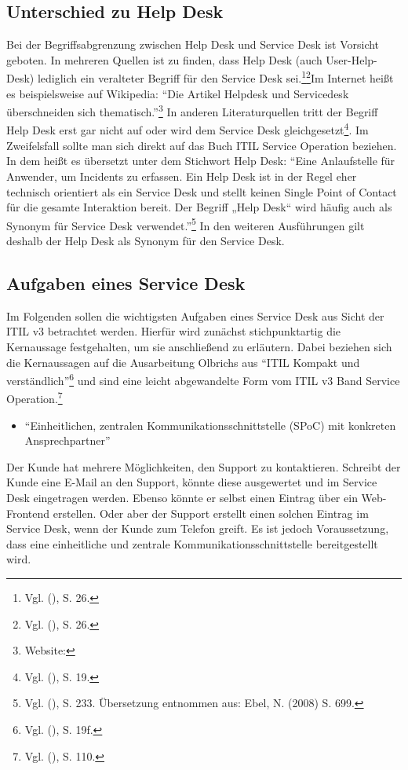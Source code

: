 \subsection{Unterschied zu Help Desk}
\noindent
Bei der Begriffsabgrenzung zwischen Help Desk und Service Desk ist Vorsicht geboten. In mehreren Quellen ist zu finden, dass Help Desk (auch User-Help-Desk) lediglich ein veralteter Begriff für den Service Desk sei.\footnote{Vgl. \citeauthor{Buchsein} (\citeyear{Buchsein}), S. 26.}\footnote{Vgl. \citeauthor{Meier} (\citeyear{Meier}), S. 26.}Im Internet heißt es beispielsweise auf Wikipedia: \enquote{Die Artikel Helpdesk und Servicedesk überschneiden sich thematisch.}\footnote{Website:\cite{WikiServiceDesk}} In anderen Literaturquellen tritt der Begriff Help Desk erst gar nicht auf oder wird dem Service Desk gleichgesetzt\footnote{Vgl. \citeauthor{Olbrich} (\citeyear{Olbrich}), S. 19.}. Im Zweifelsfall sollte man sich direkt auf das Buch ITIL Service Operation beziehen. In dem heißt es übersetzt unter dem Stichwort Help Desk:
\enquote{Eine Anlaufstelle für Anwender, um Incidents zu erfassen. Ein Help Desk ist in der
Regel eher technisch orientiert als ein Service Desk und stellt keinen Single Point
of Contact für die gesamte Interaktion bereit. Der Begriff „Help Desk“ wird häufig
auch als Synonym für Service Desk verwendet.}\footnote{Vgl. \citeauthor{Cannon} (\citeyear{Cannon}), S. 233. Übersetzung entnommen aus: Ebel, N. (2008) S. 699.} \newline
In den weiteren Ausführungen gilt deshalb der Help Desk als Synonym für den Service Desk.

\newpage


\subsection{Aufgaben eines Service Desk}
\noindent
Im Folgenden sollen die wichtigsten Aufgaben eines Service Desk aus Sicht der ITIL v3 betrachtet werden. Hierfür wird zunächst stichpunktartig die Kernaussage festgehalten, um sie anschließend zu erläutern. Dabei beziehen sich die Kernaussagen auf die Ausarbeitung Olbrichs aus \enquote{ITIL Kompakt und verständlich}\footnote{Vgl. \citeauthor{Olbrich} (\citeyear{Olbrich}), S. 19f.}
und sind eine leicht abgewandelte Form vom ITIL v3 Band Service Operation.\footnote{Vgl. \citeauthor{Cannon} (\citeyear{Cannon}), S. 110.}

\begin{itemize}
\item \enquote{Einheitlichen, zentralen Kommunikationsschnittstelle (SPoC) mit konkreten Ansprechpartner}
\end{itemize}
\noindent
Der Kunde hat mehrere Möglichkeiten, den Support zu kontaktieren. Schreibt der Kunde eine E-Mail an den Support, könnte diese ausgewertet und im Service Desk eingetragen werden. Ebenso könnte er selbst einen Eintrag über ein Web-Frontend erstellen. Oder aber der Support erstellt einen solchen Eintrag im Service Desk, wenn der Kunde zum Telefon greift. Es ist jedoch Voraussetzung, dass eine einheitliche und zentrale Kommunikationsschnittstelle bereitgestellt wird.


